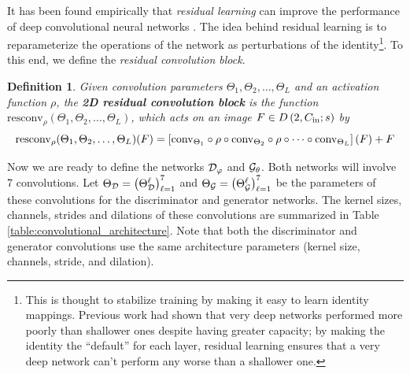 \documentclass{article}
\newtheorem{defn}{Definition}
\begin{document}
	It has been found empirically that \textit{residual learning} can improve the performance of deep convolutional neural networks \cite{ResNet}. The idea behind residual learning is to reparameterize the operations of the network as perturbations of the identity\footnote{This is thought to stabilize training by making it easy to learn identity mappings. Previous work had shown that very deep networks performed more poorly than shallower ones despite having greater capacity; by making the identity the ``default'' for each layer, residual learning ensures that a very deep network can't perform any worse than a shallower one.}. To this end, we define the \textit{residual convolution block}.
	\newcommand{\resconv}{\mathrm{resconv}}
	\begin{defn}\label{def:resconv}
		Given convolution parameters \(\Theta_1, \Theta_2, \dots, \Theta_L\) and an activation function \(\rho\), the \textbf{2D residual convolution block} is the function \(\resconv_\rho(\Theta_1, \Theta_2, \dots, \Theta_L)\), which acts on an image \(F \in {D\left(2, {C_{\textnormal{in}}}; s\right)}\) by
		\begin{equation}
			\resconv_\rho(\Theta_1, \Theta_2, \dots, \Theta_L)(F) = \left[\conv_{\Theta_1} \circ \rho \circ \conv_{\Theta_2} \circ \rho \circ \dots \circ \conv_{\Theta_L}\right](F) + F
		\end{equation}
	\end{defn}
	
	\newcommand{\dweight}{\Theta_\discriminator}
	\newcommand{\gweight}{\Theta_\generator}
	\newcommand{\xweight}{\Theta_\mathcal{X}}
	Now we are ready to define the networks \(\mathcal{D}_\varphi\) and \(\mathcal{G}_\theta\). Both networks will involve 7 convolutions. Let \(\dweight = \left(\dweight^\ell\right)_{\ell=1}^7\) and \(\gweight = \left(\gweight^\ell\right)_{\ell=1}^7\) be the parameters of these convolutions for the discriminator and generator networks. The kernel sizes, channels, strides and dilations of these convolutions are summarized in Table \ref{table:convolutional_architecture}. Note that both the discriminator and generator convolutions use the same architecture parameters (kernel size, channels, stride, and dilation). 
	
\end{document}
